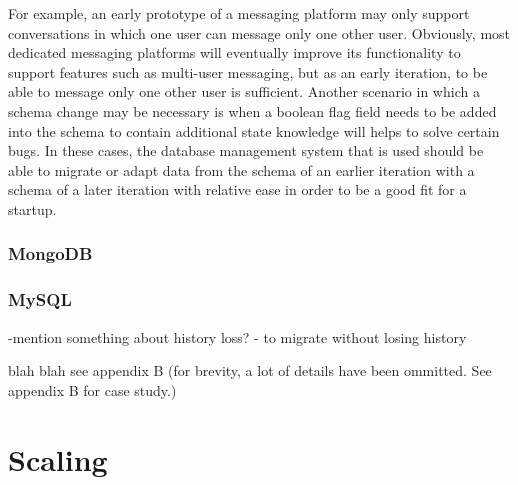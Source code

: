 \documentclass[12pt]{article}
\begin{document}
For example, an early prototype of a messaging platform may only support conversations in which one user can message only one other user. Obviously, most dedicated messaging platforms will eventually improve its functionality to support features such as multi-user messaging, but as an early iteration, to be able to message only one other user is sufficient. Another scenario in which a schema change may be necessary is when a boolean flag field needs to be added into the schema to contain additional state knowledge will helps to solve certain bugs. In these cases, the database management system that is used should be able to migrate or adapt data from the schema of an earlier iteration with a schema of a later iteration with relative ease in order to be a good fit for a startup.

\subsubsection{MongoDB}


\subsubsection{MySQL}

-mention something about history loss? - to migrate without losing history


blah blah see appendix B (for brevity, a lot of details have been ommitted. See appendix B for case study.)


\section{Scaling}
\end{document}
